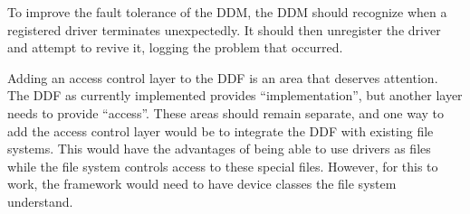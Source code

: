 To improve the fault tolerance of the DDM, the DDM should recognize
when a registered driver terminates unexpectedly.  It should then unregister
the driver and attempt to revive it, logging the problem that occurred.

Adding an access control layer to the DDF is an area that deserves attention.
The DDF as currently implemented provides ``implementation'', but another
layer needs to provide ``access''.  These areas should remain separate, and
one way to add the access control layer would be to integrate the DDF
with existing file systems.  This would have the advantages of being able
to use drivers as files while the file system controls access to these
special files.  However, for this to work, the framework would need to
have device classes the file system understand.

